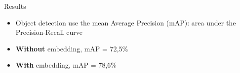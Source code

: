 \documentclass[8pt,t,aspectratio=1610]{beamer}
\newcommand{\subalgo}{{\small\textsc{SPN}}\ }
\begin{document}

\begin{frame}{Results}
\begin{itemize}
    \item Object detection use the mean Average Precision (mAP): area under the Precision-Recall curve
    \item \textbf{Without} embedding, mAP = 72,5\%
    \item \textbf{With} embedding, mAP = 78,6\%
\end{itemize}
\pause


\end{frame}
\end{document}
